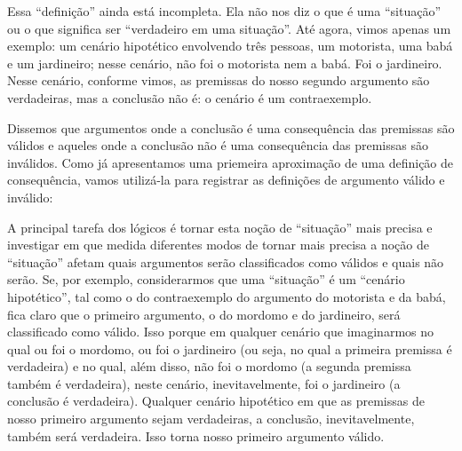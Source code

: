 Essa ``definição'' ainda está incompleta. Ela não nos diz o que é uma ``situação'' ou o que significa ser ``verdadeiro em uma situação''.
Até agora, vimos apenas um exemplo:
um cenário hipotético envolvendo três pessoas, um motorista, uma babá e um jardineiro; nesse cenário, não foi o motorista nem a babá. Foi o jardineiro. Nesse cenário, conforme vimos, as premissas do nosso segundo argumento são verdadeiras, mas a conclusão não é:
o cenário é um contraexemplo.

Dissemos que argumentos onde a conclusão é uma consequência das premissas são válidos e aqueles onde a conclusão não é uma consequência das premissas são inválidos.
Como já apresentamos uma priemeira aproximação de uma definição de consequência, vamos utilizá-la para registrar as definições de argumento válido e inválido:





A principal tarefa dos lógicos é tornar esta noção de ``situação'' mais precisa e investigar em que medida diferentes modos de tornar mais precisa a noção de ``situação'' afetam quais argumentos serão classificados como válidos e quais não serão. 
Se, por exemplo, considerarmos que uma ``situação'' é um ``cenário hipotético'', tal como o do contraexemplo do argumento do motorista e da babá, fica claro que o primeiro argumento, o do mordomo e do jardineiro, será classificado como válido.
Isso porque em qualquer cenário que imaginarmos no qual ou foi o mordomo, ou foi o jardineiro (ou seja, no qual a primeira premissa é verdadeira) e no qual, além disso, não foi o mordomo (a segunda premissa também é verdadeira), neste cenário, inevitavelmente, foi o jardineiro (a conclusão é verdadeira).
Qualquer cenário hipotético em que as premissas de nosso primeiro argumento sejam verdadeiras, a conclusão, inevitavelmente, também será verdadeira.
Isso torna nosso primeiro argumento válido.

